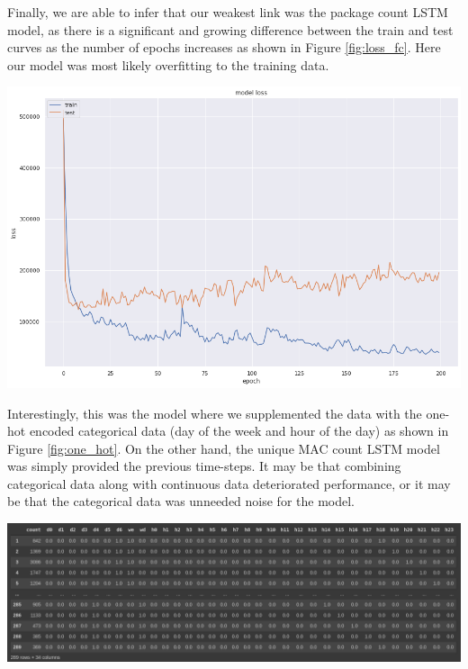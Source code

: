 \documentclass[journal, 12pt]{IEEEtran}
\begin{document}
\noindent Finally, we are able to infer that our weakest link was the package count LSTM model, as there is a significant and growing difference between the train and test curves as the number of epochs increases as shown in Figure \ref{fig:loss_fc}. Here our model was most likely overfitting to the training data. 

\begingroup
    \center
    \medskip
    \includegraphics[width=\columnwidth]{report/final_report/images/frame_count.png}
    \label{fig:loss_fc}
    \medskip
\endgroup

\noindent Interestingly, this was the model where we supplemented the data with the one-hot encoded categorical data (day of the week and hour of the day) as shown in Figure \ref{fig:one_hot}. On the other hand, the unique MAC count LSTM model was simply provided the previous time-steps. It may be that combining categorical data along with continuous data deteriorated performance, or it may be that the categorical data was unneeded noise for the model.

\begingroup
    \center
    \medskip
    \includegraphics[width=\columnwidth]{report/final_report/images/one_hot.png}
    \label{fig:one_hot}
    \medskip
\endgroup
\end{document}

